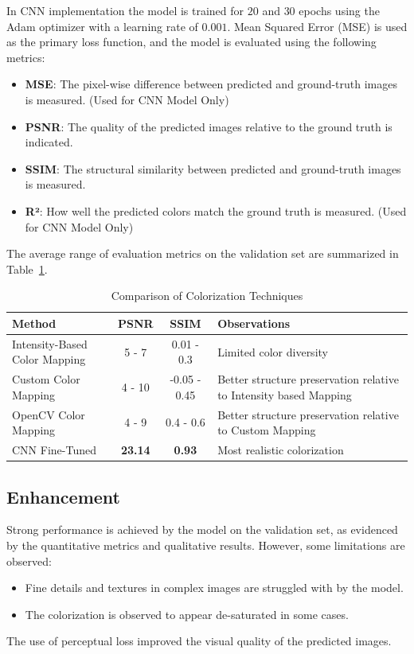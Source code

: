 \documentclass[conference]{IEEEtran}
\begin{document}
\begin{itemize}
In CNN implementation the model is trained for $20$ and $30$ epochs using the Adam optimizer with a learning rate of $0.001$. Mean Squared Error (MSE) is used as the primary loss function, and the model is evaluated using the following metrics:
\begin{itemize}
    \item \textbf{MSE}: The pixel-wise difference between predicted and ground-truth images is measured. (Used for CNN Model Only)
    \item \textbf{PSNR}: The quality of the predicted images relative to the ground truth is indicated.
    \item \textbf{SSIM}: The structural similarity between predicted and ground-truth images is measured.
    \item \textbf{R²}: How well the predicted colors match the ground truth is measured. (Used for CNN Model Only)
\end{itemize}
\end{itemize}
The average range of evaluation metrics on the validation set are summarized in Table~\ref{table:metrics_results}.

\begin{table}[t]
\centering
\renewcommand{\arraystretch}{1.1} %
\setlength{\tabcolsep}{4pt} %
\begin{tabular}{|p{2.5cm}|c|c|p{3.3cm}|}  %
\hline
\textbf{Method} & \textbf{PSNR} & \textbf{SSIM} & \textbf{Observations} \\ \hline
Intensity-Based Color Mapping & 5 - 7 & 0.01 - 0.3 & Limited color diversity \\ \hline
Custom Color Mapping & 4 - 10 & -0.05 - 0.45 & Better structure preservation relative to Intensity based Mapping \\ \hline
OpenCV Color Mapping & 4 - 9 & 0.4 - 0.6 & Better structure preservation relative to Custom Mapping \\ \hline
CNN Fine-Tuned & \textbf{23.14} & \textbf{0.93} & Most realistic colorization \\ \hline
\end{tabular}
\caption{Comparison of Colorization Techniques}
\label{table:metrics_results}
\end{table}


\subsection{Enhancement}
Strong performance is achieved by the model on the validation set, as evidenced by the quantitative metrics and qualitative results. However, some limitations are observed:
\begin{itemize}
    \item Fine details and textures in complex images are struggled with by the model.
    \item The colorization is observed to appear de-saturated in some cases.
\end{itemize}
The use of perceptual loss improved the visual quality of the predicted images.
\end{document}
